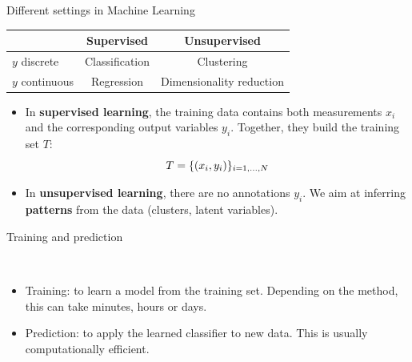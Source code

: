 \documentclass[xcolor=pdftex,dvipsnames,table]{beamer}
\begin{document}
\begin{frame}{Different settings in Machine Learning}
	\begin{table}
	\begin{tabular}{|l || c | c | }
		\hline
 		& Supervised & Unsupervised \\
		\hline \hline
		$y$ discrete & Classification & Clustering \\ 
		$y$ continuous & Regression & Dimensionality reduction\\ 
		\hline
	\end{tabular}
	\end{table}
\begin{itemize}
	\item In \textbf{supervised learning}, the training data contains both measurements $x_i$ and the corresponding output variables $y_i$. Together, they build the training set $T$:
	\begin{equation}
	T = \{(x_i, y_i)\}_{i=1, \ldots, N}
	\end{equation}
	\item In \textbf{unsupervised learning}, there are no annotations $y_i$. We aim at inferring \textbf{patterns} from the data (clusters, latent variables). 
\end{itemize}
\end{frame}

\begin{frame}{Training and prediction}
\begin{figure}[htb]
  \centering
  \\  
\end{figure}
\begin{itemize}
\item Training: to learn a model from the training set. Depending on the method, this can take minutes, hours or days.
\item Prediction: to apply the learned classifier to new data. This is usually computationally efficient. 
\end{itemize}
\end{frame}
\end{document}

